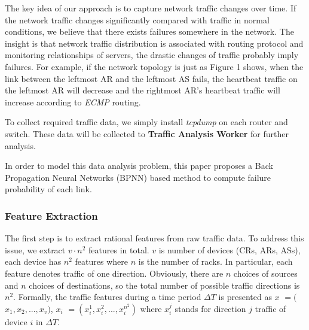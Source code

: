 \documentclass{sig-alternate-05-2015}
\begin{document}
The key idea of our approach is to capture network traffic changes over time. If the network traffic changes significantly compared with traffic in normal conditions, we believe that there exists failures somewhere in the network. The insight is that network traffic distribution is associated with routing protocol and monitoring relationships of servers, the drastic changes of traffic probably imply failures. For example, if the network topology is just as Figure 1 shows, when the link between the leftmost AR and the leftmost AS fails, the heartbeat traffic on the leftmost AR will decrease and the rightmost AR's heartbeat traffic will increase according to \textit{ECMP} routing.

To collect required traffic data, we simply install \textit{tcpdump} on each router and switch. These data will be collected to \textbf{Traffic Analysis Worker} for further analysis.

In order to model this data analysis problem, this paper proposes a Back Propagation Neural Networks (BPNN) based method to compute failure probability of each link.

\subsubsection*{Feature Extraction}
\quad The first step is to extract rational features from raw traffic data. To address this issue, we extract $v \cdot n^2$ features in total. $v$ is number of devices (CRs, ARs, ASs), each device has $n^2$ features where $n$ is the number of racks. In particular, each feature denotes traffic of one direction. Obviously, there are $n$ choices of sources and $n$ choices of destinations, so the total number of possible traffic directions is $n^2$.
Formally, the traffic features during a time period $\Delta T$ is presented as \boldmath $x$
\unboldmath $=($\boldmath $x_1, x_2, ..., x_v$\unboldmath $)$, \boldmath $x_i$
\unboldmath $=(x_i^1, x_i^2, ..., x_i^{n^2})$
where $x_i^j$ stands for direction $j$ traffic of device $i$ in $\Delta T$.
\end{document}
